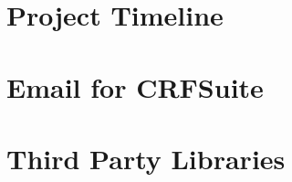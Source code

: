 %
%

\chapter{Project Timeline}
\label{sec:timeline}


\chapter{Email for CRFSuite}
\label{sec:crfemail}


\chapter{Third Party Libraries}
\label{sec:libs}

